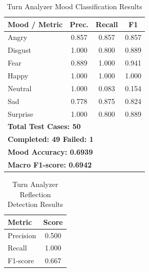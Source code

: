 \documentclass[conference]{IEEEtran}
\begin{document}
\begin{table}[!ht]
\centering
\footnotesize
\renewcommand{\arraystretch}{1.4}
\setlength{\tabcolsep}{8pt}
\begin{tabular}{|l|c|c|c|}
\hline
\textbf{Mood / Metric} & \textbf{Prec.} & \textbf{Recall} & \textbf{F1} \\ \hline
Angry    & 0.857 & 0.857 & 0.857 \\ \hline
Disgust  & 1.000 & 0.800 & 0.889 \\ \hline
Fear     & 0.889 & 1.000 & 0.941 \\ \hline
Happy    & 1.000 & 1.000 & 1.000 \\ \hline
Neutral  & 1.000 & 0.083 & 0.154 \\ \hline
Sad      & 0.778 & 0.875 & 0.824 \\ \hline
Surprise & 1.000 & 0.800 & 0.889 \\ \hline
\multicolumn{4}{|l|}{\textbf{Total Test Cases: 50}} \\ \hline
\multicolumn{4}{|l|}{\textbf{Completed: 49 \quad Failed: 1}} \\ \hline
\multicolumn{4}{|l|}{\textbf{Mood Accuracy: 0.6939}} \\ \hline
\multicolumn{4}{|l|}{\textbf{Macro F1-score: 0.6942}} \\ \hline
\end{tabular}
\renewcommand{\arraystretch}{1}
\setlength{\tabcolsep}{6pt}
\caption{Turn Analyzer Mood Classification Results}
\label{tab:mood_results}
\end{table}

\begin{table}[!ht]
\centering
\footnotesize
\renewcommand{\arraystretch}{1.4}
\setlength{\tabcolsep}{8pt}
\begin{tabular}{|l|c|}
\hline
\textbf{Metric} & \textbf{Score} \\ \hline
Precision & 0.500 \\ \hline
Recall    & 1.000 \\ \hline
F1-score  & 0.667 \\ \hline
\end{tabular}
\caption{Turn Analyzer Reflection Detection Results}
\label{tab:reflection_results}
\end{table}
\end{document}
